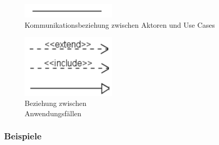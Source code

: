 \documentclass[11pt, a4paper]{article}
\begin{document}
\begin{figure}[ht]
    \centering
    \begin{minipage}[t]{0.45\textwidth}
        \centering \includegraphics[width=0.4\textwidth]{UseCase-03.png} \\
        \vspace{1em}
        \centering Kommunikationsbeziehung zwischen Aktoren und Use Cases
    \end{minipage}
    \centering
    \begin{minipage}[t]{0.45\textwidth}
        \centering \includegraphics[width=0.4\textwidth]{UseCase-04.png} \\
        \vspace{1em}
        \centering Beziehung zwischen \\ Anwendungsfällen
    \end{minipage}
\end{figure}

\vspace{2em}

\subsubsection*{Beispiele}
\end{document}
